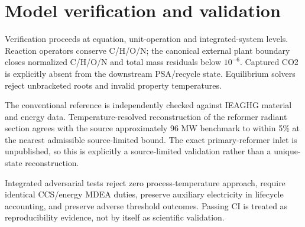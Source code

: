 \section{Model verification and validation}
Verification proceeds at equation, unit-operation and integrated-system levels. Reaction operators conserve C/H/O/N; the canonical external plant boundary closes normalized C/H/O/N and total mass residuals below $10^{-6}$. Captured CO2 is explicitly absent from the downstream PSA/recycle state. Equilibrium solvers reject unbracketed roots and invalid property temperatures.

The conventional reference is independently checked against IEAGHG material and energy data. Temperature-resolved reconstruction of the reformer radiant section agrees with the source approximately 96 MW benchmark to within 5\% at the nearest admissible source-limited bound. The exact primary-reformer inlet is unpublished, so this is explicitly a source-limited validation rather than a unique-state reconstruction.

Integrated adversarial tests reject zero process-temperature approach, require identical CCS/energy MDEA duties, preserve auxiliary electricity in lifecycle accounting, and preserve adverse threshold outcomes. Passing CI is treated as reproducibility evidence, not by itself as scientific validation.
